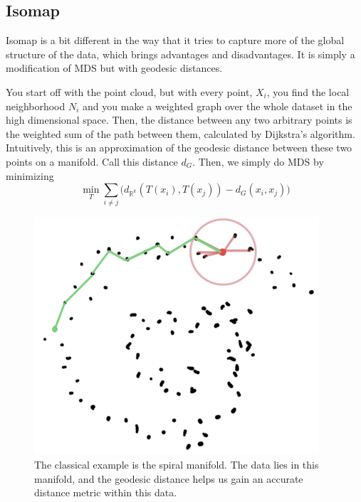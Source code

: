   \subsection{Isomap} 

    Isomap is a bit different in the way that it tries to capture more of the global structure of the data, which brings advantages and disadvantages. It is simply a modification of MDS but with geodesic distances. 

    \begin{definition}[Isomap]
      You start off with the point cloud, but with every point, $X_i$, you find the local neighborhood $N_i$ and you make a weighted graph over the whole dataset in the high dimensional space. Then, the distance between any two arbitrary points is the weighted sum of the path between them, calculated by Dijkstra's algorithm. Intuitively, this is an approximation of the geodesic distance between these two points on a manifold. Call this distance $d_G$. Then, we simply do MDS by minimizing 
      \begin{equation}
        \min_{T} \sum_{i \neq j} \big( d_{\mathbb{R}^k}(T(x_i), T(x_j)) - d_G(x_i, x_j) \big)
      \end{equation}

      \begin{figure}[H]
        \centering 
        \includegraphics[scale=0.4]{img/isomap.png}
        \caption{The classical example is the spiral manifold. The data lies in this manifold, and the geodesic distance helps us gain an accurate distance metric within this data. } 
        \label{fig:isomap}
      \end{figure}
    \end{definition}

